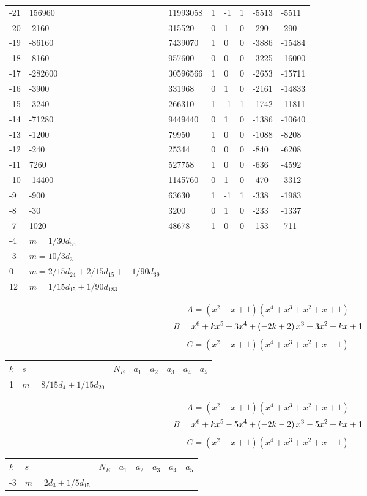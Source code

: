 \documentclass{amsart}
\begin{document}
\begin{longtable}{|l|l|l|lllll|}
-21&156960&11993058&1&-1&1&-5513&-5511\\
-20&-2160&315520&0&1&0&-290&-290\\
-19&-86160&7439070&1&0&0&-3886&-15484\\
-18&-8160&957600&0&0&0&-3225&-16000\\
-17&-282600&30596566&1&0&0&-2653&-15711\\
-16&-3900&331968&0&1&0&-2161&-14833\\
-15&-3240&266310&1&-1&1&-1742&-11811\\
-14&-71280&9449440&0&1&0&-1386&-10640\\
-13&-1200&79950&1&0&0&-1088&-8208\\
-12&-240&25344&0&0&0&-840&-6208\\
-11&7260&527758&1&0&0&-636&-4592\\
-10&-14400&1145760&0&1&0&-470&-3312\\
-9&-900&63630&1&-1&1&-338&-1983\\
-8&-30&3200&0&1&0&-233&-1337\\
-7&1020&48678&1&0&0&-153&-711\\
-4&$m=1/30d_{55}$&&\multicolumn{5}{c|}{}\\
-3&$m=10/3d_{3}$&&\multicolumn{5}{c|}{}\\
0&$m=2/15d_{24}+2/15d_{15}+-1/90d_{39}$&&\multicolumn{5}{c|}{}\\
12&$m=1/15d_{15}+1/90d_{183}$&&\multicolumn{5}{c|}{}\\
\hline
\end{longtable}
$$A=(x^2
 - x
 + 1)(x^4
 + x^3
 + x^2
 + x
 + 1)$$
$$B=x^6
 + k\*x^5
 + 3\*x^4
 + \left(-2\*k
 + 2\right) \*x^3
 + 3\*x^2
 + k\*x
 + 1$$
$$C=(x^2
 - x
 + 1)(x^4
 + x^3
 + x^2
 + x
 + 1)$$
\begin{longtable}{|l|l|l|lllll|}
\hline
$k$ & $s$ & $N_E$ & $a_1$ & $a_2$ & $a_3$ & $a_4$ & $a_5$\\
\hline
1&$m=8/15d_{4}+1/15d_{20}$&&\multicolumn{5}{c|}{}\\
\hline
\end{longtable}
$$A=(x^2
 - x
 + 1)(x^4
 + x^3
 + x^2
 + x
 + 1)$$
$$B=x^6
 + k\*x^5
 - 5\*x^4
 + \left(-2\*k
 - 2\right) \*x^3
 - 5\*x^2
 + k\*x
 + 1$$
$$C=(x^2
 - x
 + 1)(x^4
 + x^3
 + x^2
 + x
 + 1)$$
\begin{longtable}{|l|l|l|lllll|}
\hline
$k$ & $s$ & $N_E$ & $a_1$ & $a_2$ & $a_3$ & $a_4$ & $a_5$\\
\hline
-3&$m=2d_{3}+1/5d_{15}$&&\multicolumn{5}{c|}{}\\
\hline
\end{longtable}
\end{document}
